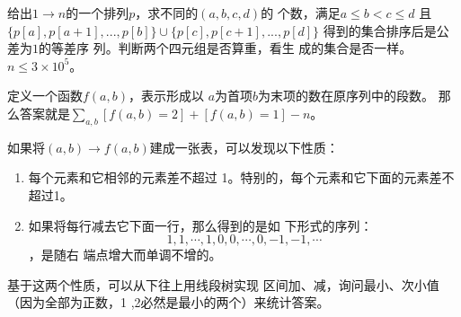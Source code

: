 
\begin{prob}
	给出$1 \to n$的一个排列$p$，求不同的$(a,b,c,d)$的
	个数，满足$a \le b<c \le d$
	且$\{p[a],p[a+1],...,p[b]\} \cup 
	\{p[c],p[c+1],...,p[d]\}$
	得到的集合排序后是公差为$1$的等差序
	列。判断两个四元组是否算重，看生
	成的集合是否一样。$n \le 3 \times 10^5$。
\end{prob}

\begin{sol}
	定义一个函数$f(a,b)$，表示形成以
	$a$为首项$b$为末项的数在原序列中的段数。
	那么答案就是$\sum_{a,b} [f(a,b)=2]+[f(a,b)=1]-n$。
	\par 如果将$(a,b) \to f(a,b)$建成一张表，可以发现以下性质：
	\begin{enumerate}
		\item 每个元素和它相邻的元素差不超过
			1。特别的，每个元素和它下面的元素差不超过1。
		\item 如果将每行减去它下面一行，那么得到的是如
			下形式的序列：\begin{displaymath} 1,1,\cdots,1,0,0,\cdots,0,-1,-1,\cdots \end{displaymath}
			，是随右
			端点增大而单调不增的。
	\end{enumerate}
	\par 基于这两个性质，可以从下往上用线段树实现
	区间加、减，询问最小、次小值（因为全部为正数，1
	,2必然是最小的两个）来统计答案。
\end{sol}
